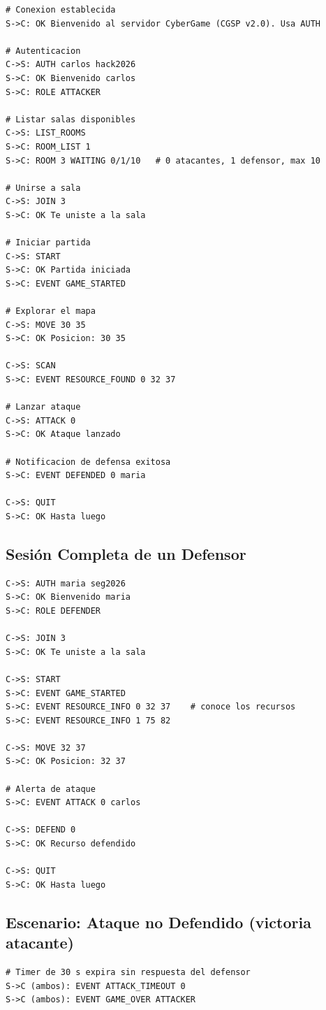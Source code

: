 \documentclass[12pt, letterpaper]{article}
\begin{document}
\begin{lstlisting}
# Conexion establecida
S->C: OK Bienvenido al servidor CyberGame (CGSP v2.0). Usa AUTH

# Autenticacion
C->S: AUTH carlos hack2026
S->C: OK Bienvenido carlos
S->C: ROLE ATTACKER

# Listar salas disponibles
C->S: LIST_ROOMS
S->C: ROOM_LIST 1
S->C: ROOM 3 WAITING 0/1/10   # 0 atacantes, 1 defensor, max 10

# Unirse a sala
C->S: JOIN 3
S->C: OK Te uniste a la sala

# Iniciar partida
C->S: START
S->C: OK Partida iniciada
S->C: EVENT GAME_STARTED

# Explorar el mapa
C->S: MOVE 30 35
S->C: OK Posicion: 30 35

C->S: SCAN
S->C: EVENT RESOURCE_FOUND 0 32 37

# Lanzar ataque
C->S: ATTACK 0
S->C: OK Ataque lanzado

# Notificacion de defensa exitosa
S->C: EVENT DEFENDED 0 maria

C->S: QUIT
S->C: OK Hasta luego
\end{lstlisting}

\subsection{Sesión Completa de un Defensor}

\begin{lstlisting}
C->S: AUTH maria seg2026
S->C: OK Bienvenido maria
S->C: ROLE DEFENDER

C->S: JOIN 3
S->C: OK Te uniste a la sala

C->S: START
S->C: EVENT GAME_STARTED
S->C: EVENT RESOURCE_INFO 0 32 37    # conoce los recursos
S->C: EVENT RESOURCE_INFO 1 75 82

C->S: MOVE 32 37
S->C: OK Posicion: 32 37

# Alerta de ataque
S->C: EVENT ATTACK 0 carlos

C->S: DEFEND 0
S->C: OK Recurso defendido

C->S: QUIT
S->C: OK Hasta luego
\end{lstlisting}

\subsection{Escenario: Ataque no Defendido (victoria atacante)}

\begin{lstlisting}
# Timer de 30 s expira sin respuesta del defensor
S->C (ambos): EVENT ATTACK_TIMEOUT 0
S->C (ambos): EVENT GAME_OVER ATTACKER
\end{lstlisting}
\end{document}
